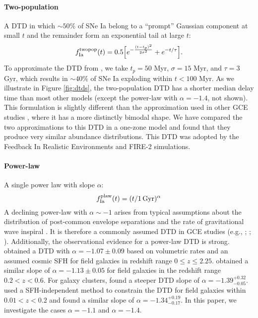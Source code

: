 \documentclass[twocolumn,twocolappendix,linenumbers]{aastex631}
\begin{document}
\paragraph{Two-population} A DTD in which $\sim50\%$ of SNe Ia belong to a ``prompt'' Gaussian component at small $t$ and the remainder form an exponential tail at large $t$:
\begin{equation}
    f_{\rm Ia}^{\rm twopop}(t) = 0.5\Big[e^{-\frac{(t-t_p)^2}{2\sigma^2}} + e^{-t/\tau}\Big].
    \label{eq:prompt-dtd}
\end{equation}
To approximate the DTD from \citet{Mannucci2006-TwoPopulations}, we take $t_p=50$ Myr, $\sigma=15$ Myr, and $\tau=3$ Gyr, which results in $\sim 40\%$ of SNe Ia exploding within $t<100$ Myr. As we illustrate in Figure \ref{fig:dtds}, the two-population DTD has a shorter median delay time than most other models (except the power-law with $\alpha=-1.4$, not shown). This formulation is slightly different than the approximation used in other GCE studies \citep[e.g.,][]{Matteucci2006-BimodalDTDConsequences,Poulhazan2018-PrecisionPollution}, where it has a more distinctly bimodal shape. We have compared the two approximations to this DTD in a one-zone model and found that they produce very similar abundance distributions. This DTD was adopted by the Feedback In Realistic Environments \citep[FIRE;][]{Hopkins2014-FIRE-1} and FIRE-2 \citep{Hopkins2018-FIRE-2} simulations.

\paragraph{Power-law} A single power law with slope $\alpha$:
\begin{equation}
    f_{\rm Ia}^{\rm plaw}(t) = (t/1\,\rm{Gyr})^\alpha
    \label{eq:powerlaw-dtd}
\end{equation}
A declining power-law with $\alpha\sim-1$ arises from typical assumptions about the distribution of post-common envelope separations and the rate of gravitational wave inspiral \citep[see Section 3.5 from][]{Maoz2014-Review}. It is therefore a commonly assumed DTD in GCE studies (e.g., \citealt{Rybizki2017-Chempy}; ; \citealt{Weinberg2023-CCSNYield}). Additionally, the observational evidence for a power-law DTD is strong. \citet{Maoz2017-CosmicDTD} obtained a DTD with $\alpha=-1.07\pm0.09$ based on volumetric rates and an assumed cosmic SFH for field galaxies in redshift range $0\leq z\leq 2.25$. \citet{Wiseman2021-DESRates} obtained a similar slope of $\alpha=-1.13\pm0.05$ for field galaxies in the redshift range $0.2<z<0.6$. For galaxy clusters, \citet{Maoz2017-CosmicDTD} found a steeper DTD slope of $\alpha=-1.39^{+0.32}_{-0.05}$. \citet{Heringer2019-FieldGalaxyDTD} used a SFH-independent method to constrain the DTD for field galaxies within $0.01<z<0.2$ and found a similar slope of $\alpha=-1.34^{+0.19}_{-0.17}$.
In this paper, we investigate the cases $\alpha=-1.1$ and $\alpha=-1.4$.
\end{document}
